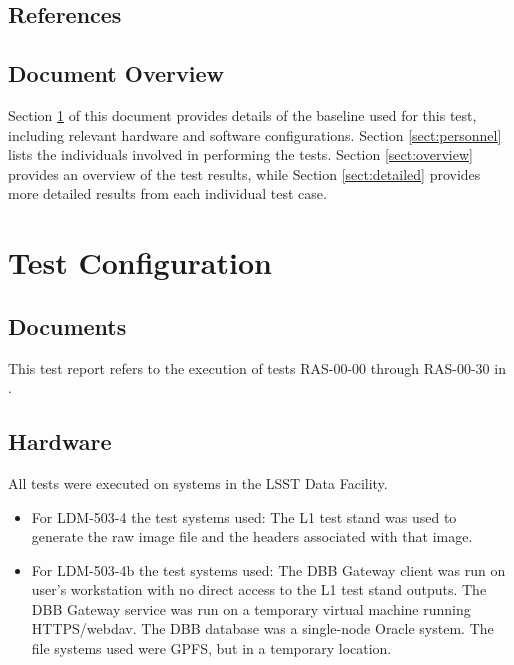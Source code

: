 \documentclass[DM,lsstdraft,STR,toc]{lsstdoc}
\begin{document}
\subsection{References}
\label{sect:references}

\renewcommand{\refname}{}


\subsection{Document Overview}
\label{sect:docoverview}

Section \ref{sect:configuration} of this document provides details of the \product{} baseline used for this test, including relevant hardware and software configurations.
Section \ref{sect:personnel} lists the individuals involved in performing the tests.
Section \ref{sect:overview} provides an overview of the test results, while Section \ref{sect:detailed} provides more detailed results from each individual test case.

\section{Test Configuration}
\label{sect:configuration}

\subsection{Documents}

This test report refers to the execution of tests RAS-00-00 through RAS-00-30 in .

\subsection{Hardware}
\label{sect:hwconf}

All tests were executed on systems in the LSST Data Facility.

\begin{itemize} 
\item{
For LDM-503-4 the test systems used:
The L1 test stand was used to generate the raw image file and the headers associated with that image.  
}
\item {
For LDM-503-4b the test systems used: 
The DBB Gateway client was run on user's workstation with no direct access to the L1 test stand outputs.
The DBB Gateway service was run on a temporary virtual machine running HTTPS/webdav.
The DBB database was a single-node Oracle system.
The file systems used were GPFS, but in a temporary location.   
}
\end{itemize}
\end{document}
